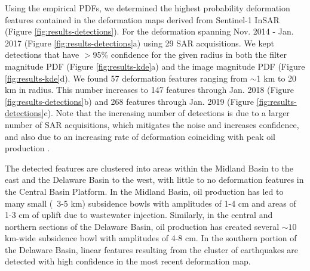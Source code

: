 \documentclass{utexasthesis}
\begin{document}
Using the empirical PDFs, we determined the highest probability deformation features contained in the deformation maps derived from Sentinel-1 InSAR (Figure \ref{fig:results-detections}). For the deformation spanning Nov. 2014 - Jan. 2017 (Figure \ref{fig:results-detections}a) using 29 SAR acquisitions. 
We kept detections that have $ > $95\% confidence for the given radius in both the filter magnitude PDF (Figure \ref{fig:results-kde}a) and the image magnitude PDF (Figure \ref{fig:results-kde}d).
We found 57 deformation features ranging from $\sim$1 km to 20 km in radius. This number increases to 147 features through Jan. 2018 (Figure \ref{fig:results-detections}b) and 268 features through Jan. 2019 (Figure \ref{fig:results-detections}c). Note that the increasing number of detections is due to a larger number of SAR acquisitions, which mitigates the noise and increases confidence, and also due to an increasing rate of deformation coinciding with peak oil production \citep{Staniewicz2020InsarRevealsComplex}.

The detected features are clustered into areas within the Midland Basin to the east and the Delaware Basin to the west, with little to no deformation features in the Central Basin Platform. In the Midland Basin, oil production has led to many small (~3-5 km) subsidence bowls with amplitudes of 1-4 cm and areas of 1-3 cm of uplift due to wastewater injection.
Similarly, in the central and northern sections of the Delaware Basin, oil production has created several $\sim10$ km-wide subsidence bowl with amplitudes of 4-8 cm. In the southern portion of the Delaware Basin, linear features resulting from the cluster of earthquakes are detected with high confidence  in the most recent deformation map.
\end{document}
